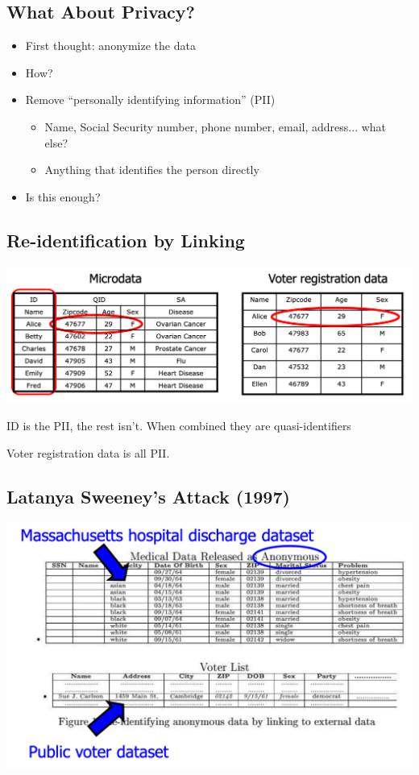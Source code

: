 \documentclass[11pt]{article}
\theoremstyle{definition}
\begin{document}
\subsection{What About Privacy?}
\begin{itemize}
    \item First thought: anonymize the data
    \item How?
    \item Remove “personally identifying information” (PII)
    \begin{itemize}
        \item Name, Social Security number, phone number, email, address... what else?
        \item Anything that identifies the person directly
    \end{itemize}
    \item Is this enough?
\end{itemize}

\subsection{Re-identification by Linking}
\includegraphics[width=\textwidth/2]{14.png}

ID is the PII, the rest isn't. When combined they are quasi-identifiers

Voter registration data is all PII.

\subsection{Latanya Sweeney’s Attack (1997)}
\includegraphics[width=\textwidth/2]{15.png}
\end{document}
